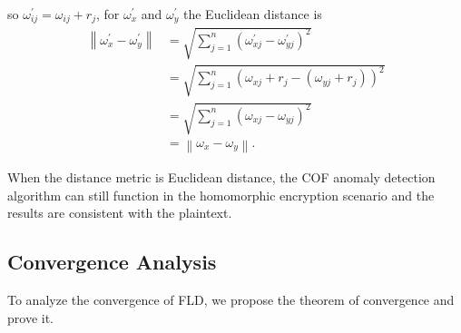 so $\omega _{ij}^{'} = \omega_{ij}  + r_{j} $, for $\omega _{x}^{'} $ and $\omega _{y}^{'} $ the Euclidean distance is
    \begin{equation}
    \begin{split}\label{hm}
	  \left \| \omega _{x}^{'}-\omega _{y}^{'} \right \| 
        & = \sqrt{\sum_{j=1}^{n}{\left( \omega _{xj}^{'}-\omega _{yj}^{'} \right)^{2} }}\\
	& =  \sqrt{\sum_{j=1}^{n}{\left( \omega_{xj}  + r_{j}- (\omega_{yj}  + r_{j}) \right)^{2} }} \\
        & = \sqrt{\sum_{j=1}^{n}{\left( \omega _{xj}-\omega _{yj} \right)^{2} }}\\
        & = \left \| \omega _{x}-\omega _{y} \right \|.
    \end{split}
\end{equation}

When the distance metric is Euclidean distance, the COF anomaly detection algorithm can still function in the homomorphic encryption scenario and the results are consistent with the plaintext.

\subsection{Convergence Analysis}
To analyze the convergence of FLD, we propose the theorem of convergence and prove it.



 
